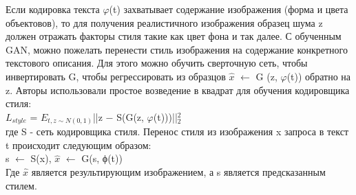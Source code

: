 \documentclass{article}
\begin{document}
    Если кодировка текста $\varphi$(t) захватывает содержание изображения (форма и цвета объектовов), то для получения реалистичного изображения образец шума z должен отражать факторы стиля такие как цвет фона и так далее. С обученным GAN, можно пожелать перенести стиль изображения на содержание конкретного текстового описания. Для этого можно обучить сверточную сеть, чтобы инвертировать G, чтобы регрессировать из образцов $\hat{x}$ $\leftarrow$ G (z, $\varphi$(t)) обратно на z. Авторы использовали простое возведение в квадрат для обучения кодировщика стиля:\\
    $L_{style}$ = $E_{t,z \sim N(0,1)}$||z − S(G(z, $\varphi$(t)))||$_{2}^2$\\
    где S - сеть кодировщика стиля. Перенос стиля из изображения x запроса в текст t происходит следующим образом:\\
    s $\leftarrow$ S(x), $\hat{x}$ $\leftarrow$ G(s, ϕ(t))\\
    Где $\hat{x}$ является результирующим изображением, а s является предсказанным стилем.
\end{document}

